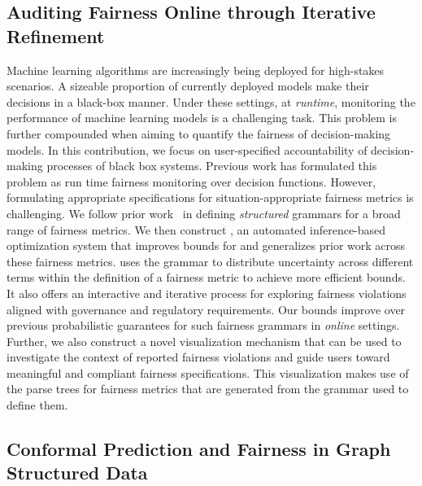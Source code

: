 \subsection{Auditing Fairness Online through Iterative Refinement}
Machine learning algorithms are increasingly being deployed for high-stakes scenarios. 
A sizeable proportion of currently deployed models make their decisions in a black-box manner. 
Under these settings, at \textit{runtime}, monitoring the performance of machine learning models is a challenging task.
This problem is further compounded when aiming to quantify the fairness of decision-making models.
In this contribution, we focus on user-specified accountability of decision-making processes of black box systems.
Previous work has formulated this problem as run time fairness monitoring over decision functions.
However, formulating appropriate specifications for situation-appropriate fairness metrics is challenging.
We follow prior work~\citep{albarghouthi2019fairness,bastani2019probabilistic} in defining \textit{structured} grammars for a broad range of fairness metrics.
We then construct \AVOIRmethodname{}, an automated inference-based optimization system that improves bounds for and generalizes prior work across these fairness metrics.
\AVOIRmethodname{} uses the grammar to distribute uncertainty across different terms within the definition of a fairness metric to achieve more efficient bounds.
It also offers an interactive and iterative process for exploring fairness violations aligned with governance and regulatory requirements.
Our bounds improve over previous probabilistic guarantees for such fairness grammars in \textit{online} settings.
Further, we also construct a novel visualization mechanism that can be used to investigate the context of reported fairness violations and guide users toward meaningful and compliant fairness specifications.
This visualization makes use of the parse trees for fairness metrics that are generated from the grammar used to define them.

\subsection*{Conformal Prediction and Fairness in Graph Structured Data}

